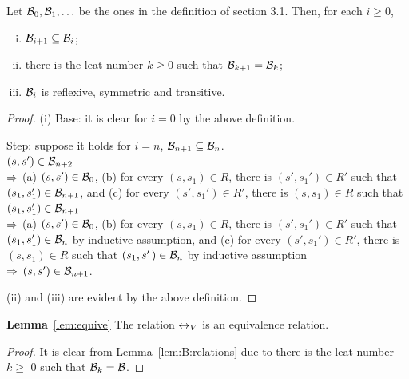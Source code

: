 \documentclass{article}
\begin{document}
\begin{lemma}\label{lem:B:relations}
  Let  ${\cal B}_0, {\cal B}_1,\ldots$ be the ones in the definition of section 3.1.
   Then,  for each $i\ge 0$,
   \begin{enumerate}[(i)]
     \item ${\cal B}_{i+1}\subseteq {\cal B}_i$;
     \item there is the leat number $k\ge 0$ such that ${\cal B}_{k+1}={\cal B}_k$;
     \item ${\cal B}_i$ is reflexive, symmetric and transitive.
   \end{enumerate}
\end{lemma}
\begin{proof}
  (i)
  Base: it is clear for $i=0$ by the above definition.

  Step: suppose it holds for $i=n$, \ie ${\cal B}_{n+1}\subseteq{\cal B}_n$. \\
  $(s,s')\in{\cal B}_{n+2}$\\
  $\Rightarrow$ (a) $(s,s')\in  {\cal B}_0$,
    (b) for every $(s,s_1)\in R$, there is $(s',s_1')\in R'$
     such that $(s_1,s_1')\in {\cal B}_{n+1}$, and
    (c)  for every $(s',s_1')\in R'$, there is $(s,s_1)\in R$
    such that $(s_1,s_1')\in {\cal B}_{n+1}$\\
  $\Rightarrow$ (a) $(s,s')\in  {\cal B}_0$,
   (b) for every $(s,s_1)\in R$, there is $(s',s_1')\in R'$
     such that $(s_1,s_1')\in {\cal B}_{n}$ by inductive assumption, and
   (c)  for every $(s',s_1')\in R'$, there is $(s,s_1)\in R$
    such that $(s_1,s_1')\in {\cal B}_{n}$ by inductive assumption\\
  $\Rightarrow$ $(s,s')\in {\cal B}_{n+1}$.

  (ii) and (iii) are evident by the above definition.
\end{proof}


\textbf{Lemma}~\ref{lem:equive}  The relation $\leftrightarrow_V$ is an equivalence relation.\\
\begin{proof}
It is clear from Lemma~\ref{lem:B:relations} due to there is the leat number $k \geq $ 0 such that ${\cal B}_k = {\cal B}$.
\end{proof}
\end{document}
